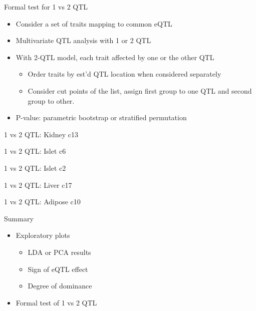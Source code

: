 \documentclass[12pt,t]{beamer}
\begin{document}
\begin{frame}[c]{Formal test for 1 vs 2 QTL}

  \begin{itemize}
  \itemsep12pt
  \item Consider a set of traits mapping to common eQTL
  \item Multivariate QTL analysis with 1 or 2 QTL
  \item With 2-QTL model, each trait affected by one or the other QTL
    \vspace*{8pt}
    \begin{itemize}
      \itemsep8pt
      \item Order traits by est'd QTL location when considered
        separately
      \item Consider cut points of the list, assign first group to one
        QTL and second group to other.
    \end{itemize}
  \item P-value: parametric bootstrap or stratified permutation
  \end{itemize}

\end{frame}


\begin{frame}[c]{1 vs 2 QTL: Kidney c13}
\end{frame}

\begin{frame}[c]{1 vs 2 QTL: Islet c6}
\end{frame}

\begin{frame}[c]{1 vs 2 QTL: Islet c2}
\end{frame}

\begin{frame}[c]{1 vs 2 QTL: Liver c17}
\end{frame}

\begin{frame}[c]{1 vs 2 QTL: Adipose c10}
\end{frame}


\begin{frame}[c]{Summary}
  \begin{itemize}
  \itemsep18pt
  \item Exploratory plots
    \vspace*{12pt}
    \begin{itemize}
    \itemsep12pt
    \item LDA or PCA results
    \item Sign of eQTL effect
    \item Degree of dominance
    \end{itemize}
  \item Formal test of 1 vs 2 QTL
  \end{itemize}
\end{frame}
\end{document}
